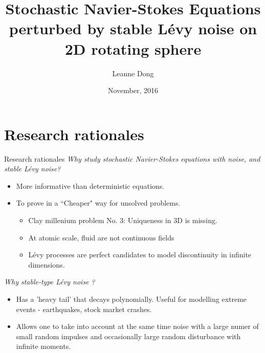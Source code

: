 \documentclass[xcolor=dvipsnames,leqno]{beamer}
\title{Stochastic Navier-Stokes Equations perturbed by stable L\'evy noise on 2D rotating sphere}
\author[Leanne Dong]{Leanne Dong\\
\vspace{1cm}{\small Supervised by: Prof. Ben Goldys}}
\institute[Usyd]{School of Mathematics and Statistics\\
The University of Sydney}
\date{November, 2016}
\begin{document}
	\begin{frame}
	  \titlepage
	\end{frame}

\section[]{Research rationales}  
\begin{frame}{Research rationales}
	\emph{Why study stochastic Navier-Stokes equations {\color{red}with noise, and {\color{red}stable} L\'evy noise}?}
	\begin{itemize}         
		\item More informative than deterministic equations.
		\item To prove in a ``Cheaper" way for unsolved problems.\\
		\begin{itemize}
			\item Clay millenium problem No. 3: Uniqueness in 3D is missing.
			\item At atomic scale, fluid are not continuous fields
			\item L\'evy processes are perfect candidates to model discontinuity in infinite dimensions.
		\end{itemize}
	\end{itemize}
	\emph{Why stable-type L\'evy noise ?}
	\begin{itemize}
		\item Has a 'heavy tail' that decays polynomially. Useful for modelling extreme events - earthquakes, stock market crashes.
		\item Allows one to take into account at the same time noise with a large numer of small random impulses and occasionally large random disturbance with infinite moments.
	\end{itemize} 
\end{frame}
\end{document}
